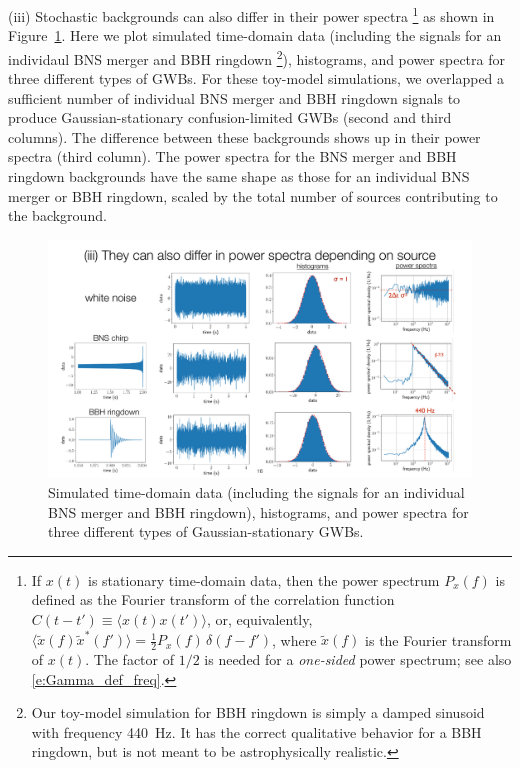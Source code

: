 (iii) Stochastic backgrounds can also differ in their power 
spectra%
\footnote{If $x(t)$ is stationary time-domain data, then the 
power spectrum $P_x(f)$ is defined as the Fourier 
transform of the correlation function 
$C(t-t') \equiv \langle x(t)x(t')\rangle$, or,
equivalently, $\langle \tilde x(f)\tilde x^*(f')\rangle =
\frac{1}{2}P_x(f)\,\delta(f-f')$, where $\tilde x(f)$ is the Fourier
transform of $x(t)$.
The factor of $1/2$ is needed for a {\em one-sided} power spectrum;
see also \eqref{e:Gamma_def_freq}.}
as shown in Figure~\ref{f:different_power_spectra}.
Here we plot simulated time-domain data (including the signals for an
individaul BNS merger and BBH ringdown%
\footnote{Our toy-model simulation for BBH ringdown is simply a 
damped sinusoid with frequency 440~Hz.
It has the correct qualitative behavior for a BBH ringdown, but 
is not meant to be astrophysically realistic.}), 
histograms, and power spectra
for three different types of GWBs.
For these toy-model simulations, we overlapped a sufficient number of 
individual BNS merger and BBH ringdown signals to produce 
Gaussian-stationary confusion-limited GWBs
(second and third columns).
The difference between these backgrounds shows up in their power 
spectra (third column).
The power spectra for the BNS merger and BBH ringdown backgrounds 
have the same shape as those for an individual BNS merger or 
BBH ringdown, scaled by the total number of sources contributing 
to the background.
%
\begin{figure}[htbp!]
\begin{center}
\includegraphics[width=\textwidth]{Figures/different_power_spectra}
\caption{Simulated time-domain data (including the signals for an
individual BNS merger and BBH ringdown), histograms, and power spectra
for three different types of Gaussian-stationary GWBs.}
\label{f:different_power_spectra}
\end{center}
\end{figure}
%

